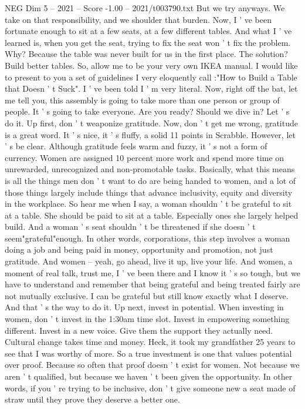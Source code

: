 \begin{textsample}{NEG Dim 5 – 2021 – Score -1.00 – 2021/t003790.txt}
But we try anyways.
We take on that responsibility, and we shoulder that burden.
Now, I ' ve been fortunate enough to sit at a few seats, at a few different tables.
And what I ' ve learned is, when you get the seat, trying to fix the seat won ' t fix the problem.
Why?
Because the table was never built for us in the first place.
The solution?
Build better tables.
So, allow me to be your very own IKEA manual.
I would like to present to you a set of guidelines I very eloquently call :"How to Build a Table that Doesn ' t Suck".
I ' ve been told I ' m very literal.
Now, right off the bat, let me tell you, this assembly is going to take more than one person or group of people.
It ' s going to take everyone.
Are you ready?
Should we dive in?
Let ' s do it.
Up first, don ' t weaponize gratitude.
Now, don ' t get me wrong, gratitude is a great word.
It ' s nice, it ' s fluffy, a solid 11 points in Scrabble.
However, let ' s be clear.
Although gratitude feels warm and fuzzy, it ' s not a form of currency.
Women are assigned 10 percent more work and spend more time on unrewarded, unrecognized and non-promotable tasks.
Basically, what this means is all the things men don ' t want to do are being handed to women, and a lot of those things largely include things that advance inclusivity, equity and diversity in the workplace.
So hear me when I say, a woman shouldn ' t be grateful to sit at a table.
She should be paid to sit at a table.
Especially ones she largely helped build.
And a woman ' s seat shouldn ' t be threatened if she doesn ' t seem"grateful"enough.
In other words, corporations, this step involves a woman doing a job and being paid in money, opportunity and promotion, not just gratitude.
And women -- yeah, go ahead, live it up, live your life.
And women, a moment of real talk, trust me, I ' ve been there and I know it ' s so tough, but we have to understand and remember that being grateful and being treated fairly are not mutually exclusive.
I can be grateful but still know exactly what I deserve.
And that ' s the way to do it.
Up next, invest in potential.
When investing in women, don ' t invest in the 1:30am time slot.
Invest in empowering something different.
Invest in a new voice.
Give them the support they actually need.
Cultural change takes time and money.
Heck, it took my grandfather 25 years to see that I was worthy of more.
So a true investment is one that values potential over proof.
Because so often that proof doesn ' t exist for women.
Not because we aren ' t qualified, but because we haven ' t been given the opportunity.
In other words, if you ' re trying to be inclusive, don ' t give someone new a seat made of straw until they prove they deserve a better one.

\end{textsample}
